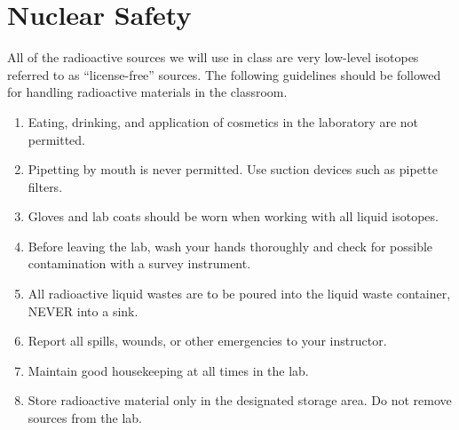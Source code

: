                                                  
\section{Nuclear Safety}

All of the radioactive sources we will use in class are very low-level
isotopes referred to as ``license-free'' sources.
The following guidelines should be followed for handling radioactive
materials in the classroom.

\begin{enumerate}

\item Eating, drinking, and application of cosmetics in the 
laboratory are not permitted.

\item Pipetting by mouth is never permitted. Use suction devices
such as pipette filters.

\item Gloves and lab coats should be worn when working with all liquid
isotopes.

\item Before leaving the lab, wash your hands thoroughly and check for
possible contamination with a survey instrument.

\item All radioactive liquid wastes are to be poured into the liquid
waste container, NEVER into a sink.

\item Report all spills, wounds, or other emergencies to your instructor.

\item Maintain good housekeeping at all times in the lab.

\item Store radioactive material only in the designated storage area. Do not
remove sources from the lab.

\end{enumerate}


